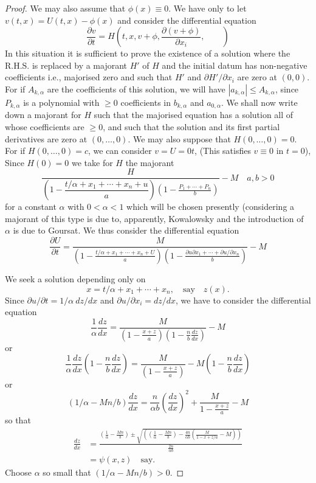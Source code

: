 \begin{proof}
We may also assume that $\phi(x)\equiv 0$. We have only to let $v(t,x)=U(t,x)-\phi(x)$ and consider the differential equation
$$
\frac{\partial v}{\partial t}=H\left(t,x,v+\phi,\frac{\partial (v+\phi)}{\partial x_{i}},\qquad\right)
$$
In this situation it is sufficient to prove the existence of a solution where the R.H.S. is replaced by a majorant $H'$ of $H$ and the initial datum has non-negative coefficients i.e., majorised zero and such that $H'$ and $\partial H'/\partial x_{i}$ are zero at $(0,0)$. For if $A_{k,\alpha}$ are the coefficients of this solution, we will have $|a_{k,\alpha}|\leq A_{k,\alpha}$, since $P_{k,\alpha}$ is a polynomial with $\geq 0$ coefficients in $b_{k,\alpha}$ and $a_{0,\alpha}$. We shall now write down a majorant for $H$ such that the majorised equation has a solution all of whose coefficients are $\geq 0$, and such that the solution and its first partial derivatives are zero at $(0,\ldots,0)$. We may also suppose that $H(0,\ldots,0)=0$. For if $H(0,\ldots,0)=c$, we can consider $v=U=0t$, (This satisfies $v\equiv 0$ in $t=0$), Since $H(0)=0$ we take for $H$ the majorant
$$
\frac{H}{\left(1-\dfrac{t/\alpha +x_{1}+\cdots+x_{n}+u}{a}\right)\left(1-\frac{P_{1}+\cdots+P_{n}}{b}\right)}-M\quad a, b>0
$$\pageoriginale
for a constant $\alpha$ with $0 < \alpha < 1$ which will be chosen presently (considering a majorant of this type is due to, apparently, Kowalowsky and the introduction of $\alpha$ is due to Goursat. We thus consider the differential equation
$$
\frac{\partial U}{\partial t}=\frac{M}{\left(1-\frac{t/\alpha+x_{1}+\cdots+x_{n}+U}{a}\right)\left(1-\frac{\partial u\partial x_{1}+\cdots+\partial u/\partial x_{n}}{b}\right)}-M
$$

We seek a solution depending only on
$$
x=t/\alpha+x_{1}+\cdots+x_{n},\quad \text{say}\quad z(x).
$$
Since $\partial u/\partial t=1/\alpha \ dz/dx$ and $\partial u/\partial x_{i}=dz/dx$, we have to consider the differential equation
$$
\frac{1}{\alpha}\frac{dz}{dx}=\frac{M}{\left(1-\frac{x+z}{a}\right)\left(1-\frac{n}{b}\frac{dz}{dx}\right)}-M
$$
or
$$
\frac{1}{\alpha}\frac{dz}{dx}\left(1-\frac{n}{b}\frac{dz}{dx}\right)=\frac{M}{\left(1-\frac{x+z}{a}\right)}-M\left(1-\frac{n}{b}\frac{dz}{dx}\right)
$$
or
$$
(1/\alpha - Mn/b)\frac{dz}{dx}=\frac{n}{\alpha b}\left(\frac{dz}{dx}\right)^{2}+\frac{M}{1-\frac{x+z}{a}}-M
$$
so that
\begin{align*}
\frac{dz}{dx} &= \frac{\left(\frac{1}{\alpha}-\frac{Mn}{b}\right)\pm \sqrt{\left(\left(\frac{1}{\alpha}-\frac{Mn}{b}\right)-\frac{4n}{\alpha b}\left(\frac{M}{1-x+z/a}-M\right)\right)}}{\frac{2n}{\alpha b}}\\
&= \psi (x,z)\quad\text{say}.
\end{align*}
Choose $\alpha$ so small that $(1/\alpha - Mn/b)>0$.


\end{proof}
